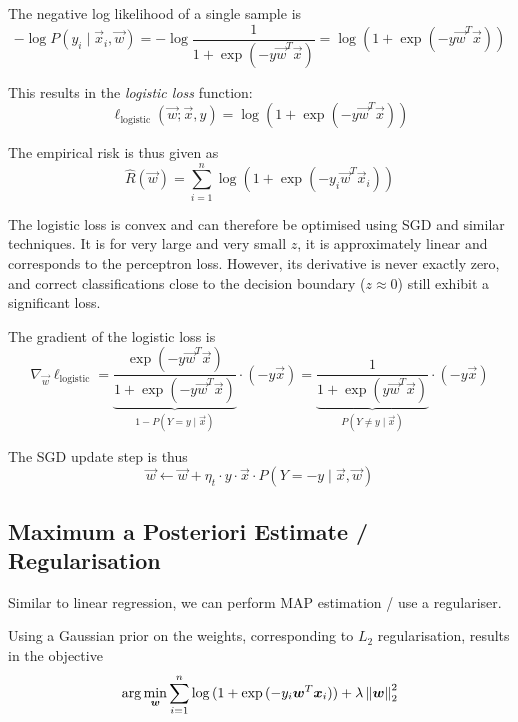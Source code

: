 The negative log likelihood of a single sample is
\begin{equation*}
    -\log{P(y_i \mid \vec{x}_i, \vec{w})}
    = -\log{\frac{1}{1 + \exp{(-y \vec{w}^T \vec{x})}}}
    = \log{(1 + \exp{(-y \vec{w}^T \vec{x})})}
\end{equation*}

This results in the \emph{logistic loss} function:
\begin{equation*}
    \ell_\text{logistic}(\vec{w}; \vec{x}, y) =
    \log{(1 + \exp{(- y \vec{w}^T \vec{x})})}
\end{equation*}

The empirical risk is thus given as
\begin{equation*}
    \hat{R}(\vec{w}) = \sum_{i=1}^n{
        \log{(1 + \exp{(-y_i \vec{w}^T \vec{x}_i)})}
    }
\end{equation*}

The logistic loss is convex and can
therefore be optimised using SGD and
similar techniques.
It is for very large and very small
$z$, it is approximately linear and
corresponds to the perceptron loss.
However, its derivative is never
exactly zero, and correct classifications
close to the decision boundary
($z \approx 0$) still exhibit
a significant loss.

The gradient of the logistic loss is
\begin{equation*}
    \nabla_{\vec{w}} \ell_\text{logistic}
    = \underbrace{\frac{\exp{(-y\vec{w}^T \vec{x})}}{1+\exp{(-y \vec{w}^T \vec{x})}}}_{1 - P(Y = y \mid \vec{x})} \cdot (-y \vec{x})
    = \underbrace{\frac{1}{1 + \exp{(y \vec{w}^T \vec{x})}}}_{P(Y \neq y \mid \vec{x})} \cdot (-y \vec{x})
\end{equation*}

The SGD update step is thus
\begin{equation*}
    \vec{w} \gets \vec{w} + \eta_t \cdot y \cdot \vec{x} \cdot P(Y = -y \mid \vec{x}, \vec{w})
\end{equation*}


\subsection{Maximum a Posteriori Estimate / Regularisation}
Similar to linear regression, we can perform
MAP estimation / use a regulariser.

Using a Gaussian prior on the weights,
corresponding to $L_2$ regularisation,
results in the objective
\begin{equation*}
    \arg\min_{\boldsymbol{w}}{
        \sum_{i=1}^n{\log{(1 + \exp{(-y_i \boldsymbol{w}^T \boldsymbol{x}_i)})}}
        + \lambda \left\lVert\boldsymbol{w}\right\rVert_2^2
    }
\end{equation*}


